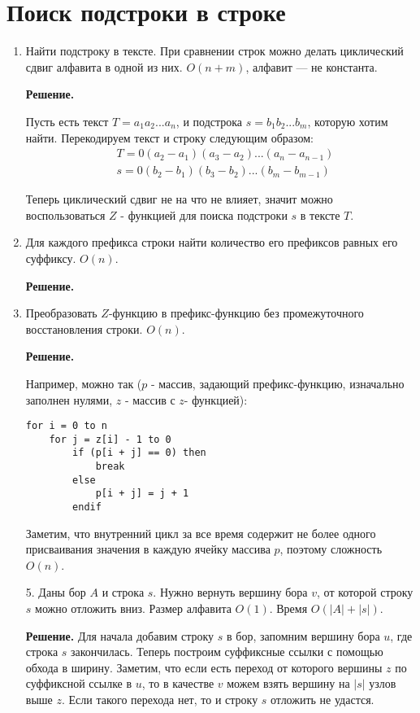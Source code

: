\section*{Поиск подстроки в строке}
\begin{enumerate}
	\item Найти подстроку в тексте. При сравнении строк можно делать циклический сдвиг алфавита в одной из них. 
	$O(n + m)$, алфавит — не константа.
	
	\textbf{Решение.}
	
	Пусть есть текст $T = a_1a_2...a_n$, и подстрока $s = b_1b_2...b_m$, которую хотим найти. Перекодируем текст и 
	строку следующим образом:
	\begin{align*}
		& T = 0(a_2 - a_1)(a_3 - a_2)...(a_n - a_{n - 1}) \\
		& s = 0(b_2 - b_1)(b_3 - b_2)...(b_m - b_{m - 1})
	\end{align*}
	
	Теперь циклический сдвиг не на что не влияет, значит можно воспользоваться $Z$ - функцией для поиска подстроки 
	$s$ в тексте $T$.
	
	\item Для каждого префикса строки найти количество его префиксов равных его суффиксу. $O(n)$.
	
	\textbf{Решение.}
	
	\item Преобразовать $Z$-функцию в префикс-функцию без промежуточного восстановления строки. $O(n)$.
	
	\textbf{Решение.}
	
	Например, можно так ($p$ - массив, задающий префикс-функцию, изначально заполнен нулями, $z$ - массив с $z$- 
	функцией):
	\begin{lstlisting}
for i = 0 to n
	for j = z[i] - 1 to 0
		if (p[i + j] == 0) then
			break
		else
			p[i + j] = j + 1
		endif
	\end{lstlisting}
	
	Заметим, что внутренний цикл за все время содержит не более одного присваивания значения в каждую ячейку 
	массива $p$, поэтому сложность $O(n)$. 
	\item[5.] Даны бор $A$ и строка $s$. Нужно вернуть вершину бора $v$, от которой строку $s$ можно отложить вниз. 
	Размер алфавита $O(1)$. Время $O(|A| + |s|)$.
	
	\textbf{Решение.}
	Для начала добавим строку $s$ в бор, запомним вершину бора $u$, где строка $s$ закончилась. Теперь построим 
	суффиксные ссылки с помощью обхода в ширину. Заметим, что если есть переход от которого вершины $z$ по 
	суффиксной ссылке в $u$, то в качестве $v$ можем взять вершину на $|s|$ узлов выше $z$. Если такого перехода 
	нет, то и строку $s$ отложить не удастся. 
	

\end{enumerate}
